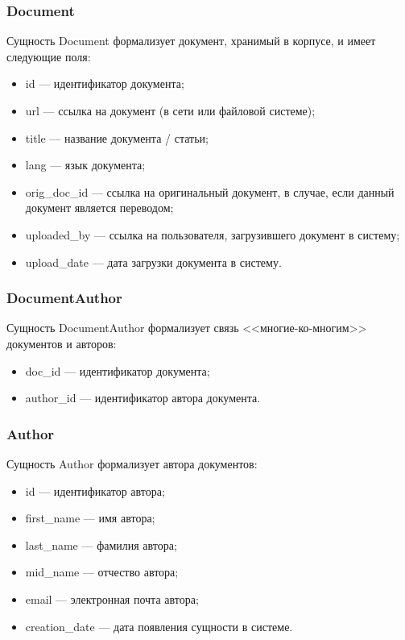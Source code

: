 \subsubsection*{Document}

Сущность Document формализует документ, хранимый в корпусе, и имеет следующие поля:
\begin{itemize}
    \item id --- идентификатор документа;
    \item url --- ссылка на документ (в сети или файловой системе);
    \item title --- название документа / статьи;
    \item lang --- язык документа;
    \item orig\_doc\_id --- ссылка на оригинальный документ, в случае, если данный документ является переводом;
    \item uploaded\_by --- ссылка на пользователя, загрузившего документ в систему;
    \item upload\_date --- дата загрузки документа в систему.
\end{itemize}

\subsubsection*{DocumentAuthor}

Сущность DocumentAuthor формализует связь <<многие-ко-многим>> документов и авторов:
\begin{itemize}
    \item doc\_id --- идентификатор документа;
    \item author\_id --- идентификатор автора документа.
\end{itemize}

\subsubsection*{Author}

Сущность Author формализует автора документов:
\begin{itemize}
    \item id --- идентификатор автора;
    \item first\_name --- имя автора;
    \item last\_name --- фамилия автора;
    \item mid\_name --- отчество автора;
    \item email --- электронная почта автора;
    \item creation\_date --- дата появления сущности в системе.
\end{itemize}

